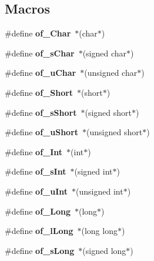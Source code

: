 \subsection*{Macros}
\begin{DoxyCompactItemize}
\item 
\#define {\bfseries of\+\_\+\+Char}~$\ast$(char$\ast$)\label{group__prep__group_gabcfcd74817919703a130dbc1cbb57bed}

\item 
\#define {\bfseries of\+\_\+s\+Char}~$\ast$(signed char$\ast$)\label{group__prep__group_ga679d07007e61761bec873e67f0aa26ea}

\item 
\#define {\bfseries of\+\_\+u\+Char}~$\ast$(unsigned char$\ast$)\label{group__prep__group_gaa123653b9114c4bdc3e5394ffe390aa9}

\item 
\#define {\bfseries of\+\_\+\+Short}~$\ast$(short$\ast$)\label{group__prep__group_ga29102bbb7c49380c032672464d0c21b1}

\item 
\#define {\bfseries of\+\_\+s\+Short}~$\ast$(signed short$\ast$)\label{group__prep__group_ga6144058541f159966bbb43c15ef6eb16}

\item 
\#define {\bfseries of\+\_\+u\+Short}~$\ast$(unsigned short$\ast$)\label{group__prep__group_ga9a7b4f128c834c336c604c4967b3ae05}

\item 
\#define {\bfseries of\+\_\+\+Int}~$\ast$(int$\ast$)\label{group__prep__group_gad13bbd80bfa8a4b060b0c3c8ee8b4593}

\item 
\#define {\bfseries of\+\_\+s\+Int}~$\ast$(signed int$\ast$)\label{group__prep__group_gab44ba54e2338cf1fafc7d27f896b7015}

\item 
\#define {\bfseries of\+\_\+u\+Int}~$\ast$(unsigned int$\ast$)\label{group__prep__group_ga8bf6641d75fd9053261a16bb6b2caf0a}

\item 
\#define {\bfseries of\+\_\+\+Long}~$\ast$(long$\ast$)\label{group__prep__group_gae44e91d7b6ae86e944ae0bbaa99833ae}

\item 
\#define {\bfseries of\+\_\+l\+Long}~$\ast$(long long$\ast$)\label{group__prep__group_gac6b50729853f98250eac5019393be709}

\item 
\#define {\bfseries of\+\_\+s\+Long}~$\ast$(signed long$\ast$)\label{group__prep__group_gabf4d5db51a66d2f32d406a38b6658fd4}


\end{DoxyCompactItemize}
